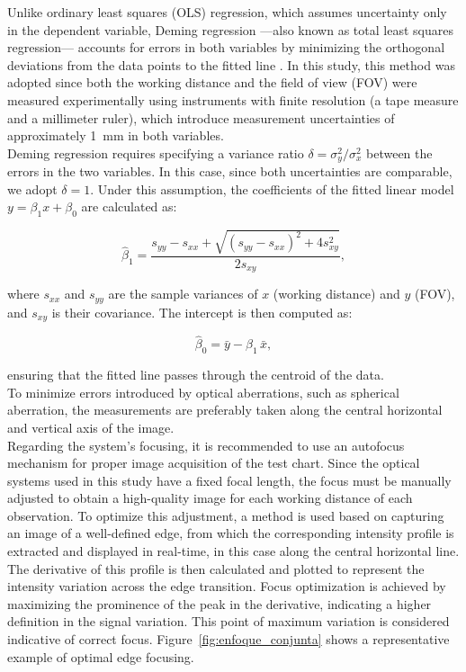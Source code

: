 \noindent Unlike ordinary least squares (OLS) regression, which assumes uncertainty only in the dependent variable, Deming regression ---also known as total least squares regression--- accounts for errors in both variables by minimizing the orthogonal deviations from the data points to the fitted line \cite{Deming1943ErrorsInVariables}. In this study, this method was adopted since both the working distance and the field of view (FOV) were measured experimentally using instruments with finite resolution (a tape measure and a millimeter ruler), which introduce measurement uncertainties of approximately \SI{1}{\milli\meter} in both variables. \\

\noindent Deming regression requires specifying a variance ratio $\delta = \sigma_y^2 / \sigma_x^2$ between the errors in the two variables. In this case, since both uncertainties are comparable, we adopt $\delta=1$. Under this assumption, the coefficients of the fitted linear model $y = \beta_1 x + \beta_0$ are calculated as:

\begin{equation}
\hat{\beta}_1 = \frac{s_{yy} - s_{xx} + \sqrt{(s_{yy} - s_{xx})^2 + 4s_{xy}^2}}{2s_{xy}},
\end{equation}

\noindent where $s_{xx}$ and $s_{yy}$ are the sample variances of $x$ (working distance) and $y$ (FOV), and $s_{xy}$ is their covariance. The intercept is then computed as:

\begin{equation}
\hat{\beta}_0 = \bar{y} - \hat{\beta}_1\,\bar{x},
\end{equation}

\noindent ensuring that the fitted line passes through the centroid of the data.\\

\noindent To minimize errors introduced by optical aberrations, such as spherical aberration, the measurements are preferably taken along the central horizontal and vertical axis of the image.\\

\noindent Regarding the system's focusing, it is recommended to use an autofocus mechanism for proper image acquisition of the test chart. Since the optical systems used in this study have a fixed focal length, the focus must be manually adjusted to obtain a high-quality image for each working distance of each observation. To optimize this adjustment, a method is used based on capturing an image of a well-defined edge, from which the corresponding intensity profile is extracted and displayed in real-time, in this case along the central horizontal line. The derivative of this profile is then calculated and plotted to represent the intensity variation across the edge transition. Focus optimization is achieved by maximizing the prominence of the peak in the derivative, indicating a higher definition in the signal variation. This point of maximum variation is considered indicative of correct focus. Figure~\ref{fig:enfoque_conjunta} shows a representative example of optimal edge focusing.\\


